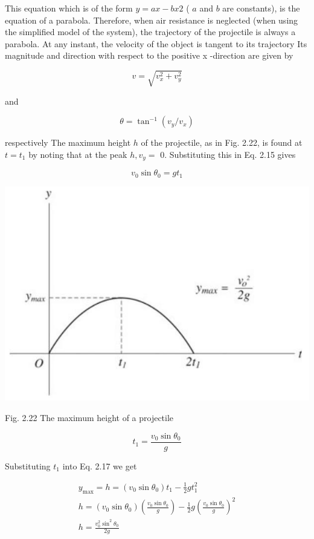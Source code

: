\documentclass[10pt]{article}
\begin{document}
This equation which is of the form $y=a x-b x 2$ ( $a$ and $b$ are constants), is the equation of a parabola. Therefore, when air resistance is neglected (when using the simplified model of the system), the trajectory of the projectile is always a parabola. At any instant, the velocity of the object is tangent to its trajectory Its magnitude and direction with respect to the positive x -direction are given by

$$
v=\sqrt{v_{x}^{2}+v_{y}^{2}}
$$

and

$$
\theta=\tan ^{-1}\left(v_{y} / v_{x}\right)
$$

respectively The maximum height $h$ of the projectile, as in Fig. 2.22, is found at $t=t_{1}$ by noting that at the peak $h, v_{y}=$ 0. Substituting this in Eq. 2.15 gives

$$
v_{0} \sin \theta_{0}=g t_{1}
$$

\begin{center}
\includegraphics[max width=\textwidth]{2024_09_13_db1f357d2aad0a03eb2eg-039}
\end{center}

Fig. 2.22 The maximum height of a projectile

$$
t_{1}=\frac{v_{0} \sin \theta_{0}}{g}
$$

Substituting $t_{1}$ into Eq. 2.17 we get

$$
\begin{gathered}
y_{\max }=h=\left(v_{0} \sin \theta_{0}\right) t_{1}-\frac{1}{2} g t_{1}^{2} \\
h=\left(v_{0} \sin \theta_{0}\right)\left(\frac{v_{0} \sin \theta_{0}}{g}\right)-\frac{1}{2} g\left(\frac{v_{0} \sin \theta_{0}}{g}\right)^{2} \\
h=\frac{v_{0}^{2} \sin ^{2} \theta_{0}}{2 g}
\end{gathered}
$$
\end{document}
